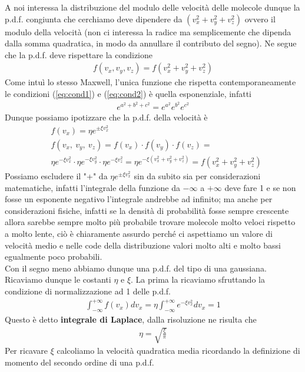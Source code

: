 \documentclass[
10pt, %
a4paper, %
oneside, %
headinclude,footinclude, %
BCOR5mm, %
]{scrartcl}
\begin{document}
A noi interessa la distribuzione del modulo delle velocità delle molecole dunque la p.d.f. congiunta che cerchiamo deve dipendere da $(v_x^2+v_y^2+v_z^2)$ ovvero il modulo della velocità (non ci interessa la radice ma semplicemente che dipenda dalla somma quadratica, in modo da annullare il contributo del segno). Ne segue che la p.d.f. deve rispettare la condizione
\begin{align}\label{eq:cond2}
	f(v_x,v_y,v_z) = f(v_x^2+v_y^2+v_z^2)
\end{align} 
Come intuì lo stesso Maxwell, l'unica funzione che rispetta contemporaneamente le condizioni (\ref{eq:cond1}) e (\ref{eq:cond2}) è quella esponenziale, infatti
\begin{align*} 
	e^{a^2+b^2+c^2}=e^{a^2} e^{b^2} e^{c^2}
\end{align*} 
Dunque possiamo ipotizzare che la p.d.f. della velocità è
\begin{align*} 
	&f(v_x) = \eta e^{\pm \xi v_x^2}\\
	&f(v_x,\ v_y,\ v_z) = f(v_x)\cdot f(v_y)\cdot f(v_z)=\\
	&\eta e^{- \xi v_x^2}\cdot\eta e^{- \xi v_y^2}\cdot\eta e^{- \xi v_z^2}=\eta e^{- \xi (v_x^2+v_y^2+v_z^2)}=f(v_x^2+v_y^2+v_z^2)
\end{align*} 
Possiamo escludere il "+" da \(\eta e^{\pm \xi v_x^2}\) sin da subito sia per considerazioni matematiche, infatti l'integrale della funzione da $- \infty$ a $+ \infty$ deve fare 1 e se non fosse un esponente negativo l'integrale andrebbe ad infinito; ma anche per considerazioni fisiche, infatti se la densità di probabilità fosse sempre crescente allora sarebbe sempre molto più probabile trovare molecole molto veloci rispetto a molto lente, ciò è chiaramente assurdo perché ci aspettiamo un valore di velocità medio e nelle code della distribuzione valori molto alti e molto bassi egualmente poco probabili.\\
Con il segno meno abbiamo dunque una p.d.f. del tipo di una gaussiana. Ricaviamo dunque le costanti $\eta$ e $\xi$. La prima la ricaviamo sfruttando la condizione di normalizzazione ad 1 delle p.d.f.
\begin{align*} 
	\int_{-\infty}^{+\infty} f(v_x)dv_x = \eta \int_{-\infty}^{+\infty} e^{- \xi v_x^2} dv_x = 1
\end{align*} 
Questo è detto \textbf{integrale di Laplace}, dalla risoluzione ne risulta che
\begin{align*} 
	\eta = \sqrt{\frac{\xi}{\pi}}
\end{align*} 
Per ricavare $\xi$ calcoliamo la velocità quadratica media ricordando la definizione di momento del secondo ordine di una p.d.f.
\end{document}
